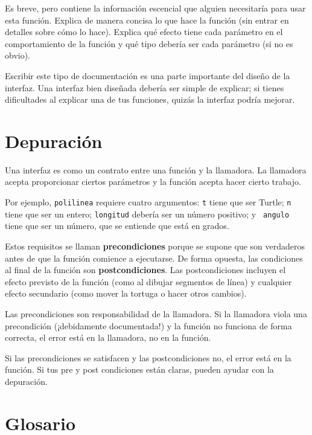 \documentclass[10pt]{book}
\begin{document}
Es breve, pero contiene la información escencial
que alguien necesitaría para usar esta función.  Explica de manera concisa lo que
hace la función (sin entrar en detalles sobre cómo lo
hace).  Explica qué efecto tiene cada parámetro en el comportamiento de
la función y qué tipo debería ser cada parámetro (si no es
obvio).

Escribir este tipo de documentación es una parte importante del diseño de la
interfaz.  Una interfaz bien diseñada debería ser simple de explicar;
si tienes dificultades al explicar una de tus funciones,
quizás la interfaz podría mejorar.


\section{Depuración}

Una interfaz es como un contrato entre una función y la llamadora.
La llamadora acepta proporcionar ciertos parámetros y la función
acepta hacer cierto trabajo.

Por ejemplo, {\tt polilinea} requiere cuatro argumentos: {\tt t} tiene que ser
Turtle; {\tt n} tiene que ser un
entero; {\tt longitud} debería ser un número positivo; y {\tt
  angulo} tiene que ser un número, que se entiende que está en grados.

Estos requisitos se llaman {\bf precondiciones} porque
se supone que son verdaderos antes de que la función comience a ejecutarse.
De forma opuesta, las condiciones al final de la función son
{\bf postcondiciones}.  Las postcondiciones incluyen el efecto
previsto de la función (como al dibujar segmentos de línea) y cualquier
efecto secundario (como mover la tortuga o hacer otros cambios).

Las precondiciones son responsabilidad de la llamadora.  Si la llamadora
viola una precondición (¡debidamente documentada!) y la función
no funciona de forma correcta, el error está en la llamadora, no en la función.

Si las precondiciones se satisfacen y las postcondiciones
no, el error está en la función.  Si tus pre y post condiciones
están claras, pueden ayudar con la depuración.


\section{Glosario}
\end{document}
